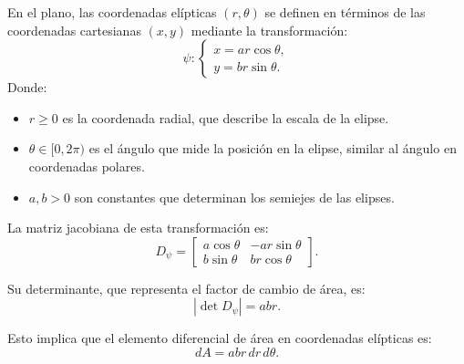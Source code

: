 \begin{definición}
En el plano, las coordenadas elípticas $(r, \theta)$ se definen en términos de las coordenadas cartesianas $(x, y)$ mediante la transformación:
$$
    \psi:
    \begin{cases}
        x = a r \cos\theta, \\
        y = b r \sin\theta.
    \end{cases}
$$
Donde:
\begin{itemize}
    \item $r \geq 0$ es la coordenada radial, que describe la escala de la elipse.
    \item $\theta \in [0, 2\pi)$ es el ángulo que mide la posición en la elipse, similar al ángulo en coordenadas polares.
    \item $a, b > 0$ son constantes que determinan los semiejes de las elipses.
\end{itemize}

La matriz jacobiana de esta transformación es: $$ D_\psi =
    \begin{bmatrix}
        a\cos\theta & -a r \sin\theta \\
        b\sin\theta & b r \cos\theta
    \end{bmatrix}.
$$

Su determinante, que representa el factor de cambio de área, es: $$ \left| \det
    D_\psi \right| = a b r. $$

Esto implica que el elemento diferencial de área en coordenadas elípticas es:
$$ dA = a b r \, dr \, d\theta. $$

\end{definición}

\vspace{1em}

